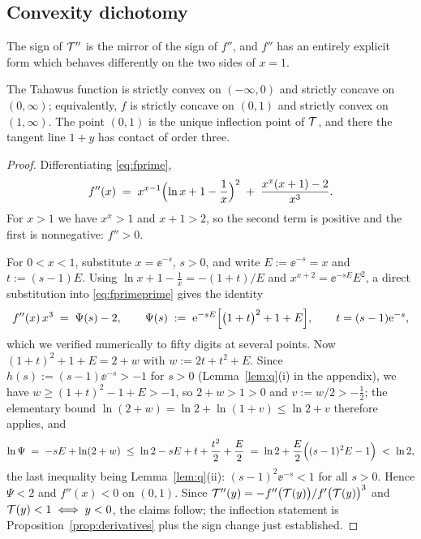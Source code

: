 \subsection{Convexity dichotomy}

The sign of $\mathcal{T}''$ is the mirror of the sign of $f''$, and $f''$ has
an entirely explicit form which behaves differently on the two sides of
$x = 1$.

\begin{theorem}\label{thm:convexity}
The Tahawus function is strictly convex on $(-\infty, 0)$ and strictly
concave on $(0, \infty)$; equivalently, $f$ is strictly concave on
$(0,1)$ and strictly convex on $(1,\infty)$. The point $(0,1)$ is the
unique inflection point of $\mathcal{T}$, and there the tangent line $1 + y$
has contact of order three.
\end{theorem}

\begin{proof}
Differentiating \eqref{eq:fprime},
\begin{equation}\label{eq:fprimeprime}
    f''(x) \;=\; x^{x-1}\Bigl(\ln x + 1 - \frac{1}{x}\Bigr)^{2}
    \;+\; \frac{x^{x}(x+1) - 2}{x^{3}} .
\end{equation}
For $x > 1$ we have $x^{x} > 1$ and $x + 1 > 2$, so the second term is
positive and the first is nonnegative: $f'' > 0$.

For $0 < x < 1$, substitute $x = \ee^{-s}$, $s > 0$, and write
$E := \ee^{-s} = x$ and $t := (s-1)E$. Using
$\ln x + 1 - \tfrac1x = -(1+t)/E$ and $x^{x+2} = \ee^{-sE}E^{2}$, a
direct substitution into \eqref{eq:fprimeprime} gives the identity
\begin{equation}\label{eq:psi-identity}
    f''(x)\,x^{3} \;=\; \Psi(s) - 2,
    \qquad
    \Psi(s) \;:=\; \mathrm{e}^{-sE}\Bigl[\bigl(1 + t\bigr)^{2} + 1 + E\Bigr],
    \qquad t = (s-1)\mathrm{e}^{-s},
\end{equation}
which we verified numerically to fifty digits at several points. Now
$(1+t)^{2} + 1 + E = 2 + w$ with $w := 2t + t^{2} + E$. Since
$h(s) := (s-1)\ee^{-s} > -1$ for $s > 0$ (Lemma~\ref{lem:q}(i) in the
appendix), we have $w \ge (1+t)^{2} - 1 + E > -1$, so $2 + w > 1 > 0$
and $v := w/2 > -\tfrac12$; the elementary bound
$\ln(2+w) = \ln 2 + \ln(1+v) \le \ln 2 + v$ therefore applies, and
\[
    \ln \Psi
    \;=\; -sE + \ln(2 + w)
    \;\le\; \ln 2 - sE + t + \frac{t^{2}}{2} + \frac{E}{2}
    \;=\; \ln 2 + \frac{E}{2}\Bigl((s-1)^{2}E - 1\Bigr)
    \;<\; \ln 2 ,
\]
the last inequality being Lemma~\ref{lem:q}(ii):
$(s-1)^{2}\ee^{-s} < 1$ for all $s > 0$. Hence $\Psi < 2$ and
$f''(x) < 0$ on $(0,1)$. Since
$\mathcal{T}''(y) = -f''\bigl(\mathcal{T}(y)\bigr)/f'\bigl(\mathcal{T}(y)\bigr)^{3}$ and
$\mathcal{T}(y) < 1 \iff y < 0$, the claims follow; the inflection statement
is Proposition~\ref{prop:derivatives} plus the sign change just
established.
\end{proof}

